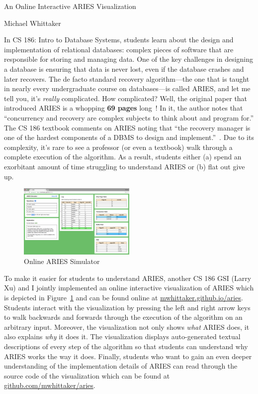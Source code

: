 \documentclass[12pt]{article}
\begin{document}
\begin{center}
  {\Large An Online Interactive ARIES Visualization}

  Michael Whittaker
\end{center}

In CS 186: Intro to Database Systems, students learn about the design and
implementation of relational databases: complex pieces of software that are
responsible for storing and managing data. One of the key challenges in
designing a database is ensuring that data is never lost, even if the database
crashes and later recovers. The de facto standard recovery algorithm---the one
that is taught in nearly every undergraduate course on databases---is called
ARIES, and let me tell you, it's \emph{really} complicated. How complicated?
Well, the original paper that introduced ARIES is a whopping \textbf{69 pages}
long~\cite{mohan1992aries}! In it, the author notes that ``concurrency and
recovery are complex subjects to think about and program for.'' The CS 186
textbook comments on ARIES noting that ``the recovery manager is one of the
hardest components of a DBMS to design and
implement.''~\cite{ramakrishnan2000database}. Due to its complexity, it's rare
to see a professor (or even a textbook) walk through a complete execution of
the algorithm. As a result, students either (a) spend an exorbitant amount of
time struggling to understand ARIES or (b) flat out give up.

\begin{figure}
  \centering
  \includegraphics[width=0.5\textwidth]{aries.png}
  \caption{Online ARIES Simulator}\label{LarrysAries}
\end{figure}

To make it easier for students to understand ARIES, another CS 186 GSI (Larry
Xu) and I jointly implemented an online interactive visualization of ARIES
which is depicted in Figure~\ref{LarrysAries} and can be found online at
\url{mwhittaker.github.io/aries}. Students interact with the visualization by
pressing the left and right arrow keys to walk backwards and forwards through
the execution of the algorithm on an arbitrary input. Moreover, the
visualization not only shows \emph{what} ARIES does, it also explains
\emph{why} it does it. The visualization displays auto-generated textual
descriptions of every step of the algorithm so that students can understand why
ARIES works the way it does. Finally, students who want to gain an even deeper
understanding of the implementation details of ARIES can read through the
source code of the visualization which can be found at
\url{github.com/mwhittaker/aries}.
\end{document}
